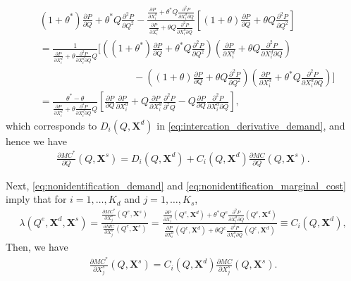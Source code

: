 \documentclass[11pt, a4paper]{article}
\begin{document}
\begin{align}
    &(1+ \theta^{*})\frac{\partial P}{\partial Q} + \theta^{*} Q\frac{\partial^2 P}{\partial Q^2} - \frac{\frac{\partial P}{\partial X^{d}_i} + \theta^{*} Q\frac{\partial^2 P}{\partial X^{d}_i\partial Q} }{\frac{\partial P}{\partial X^{d}_i} + \theta Q\frac{\partial^2 P}{\partial X^{d}_i\partial Q} }\left[(1+ \theta) \frac{\partial P}{\partial Q} + \theta Q\frac{\partial^2 P}{\partial Q^2}\right]\\
    &= \frac{1}{\frac{\partial P}{\partial X^{d}_i} + \theta\frac{\partial^2 P}{\partial X^{d}_i\partial Q}Q}\Bigg[\left((1 + \theta^{*}) \frac{\partial P}{\partial Q} + \theta^{*} Q\frac{\partial^2 P}{\partial  Q^2}\right)\left(\frac{\partial P}{\partial X^{d}_i} + \theta Q\frac{\partial^2 P}{\partial X^{d}_i\partial Q}\right)\\
    &\hspace{4cm} - \left( (1 + \theta) \frac{\partial P}{\partial Q} + \theta Q\frac{\partial^2 P}{\partial Q^2}\right)\left(\frac{\partial P}{\partial X^{d}_i} + \theta^{*} Q\frac{\partial^2 P}{\partial X^{d}_i\partial Q}\right)\Bigg]\\
    & =  \frac{\theta^{*} - \theta}{\frac{\partial P}{\partial X^{d}_i} + \theta\frac{\partial^2 P}{\partial X^{d}_i\partial Q}Q}\left[ \frac{\partial P}{\partial Q} \frac{\partial P}{\partial X^{d}_i} + Q\frac{\partial P}{\partial X^{d}_i}\frac{\partial^2 P}{\partial^2 Q} - Q\frac{\partial P}{\partial Q}\frac{\partial^2 P}{\partial X^{d}_i \partial Q} \right],
\end{align}
which corresponds to $D_i(Q, \bm{X}^{d})$ in \eqref{eq:intercation_derivative_demand}, and hence we have
\begin{align}
    \frac{\partial MC^{*}}{\partial Q}(Q, \bm{X}^{s}) = D_i(Q, \bm{X}^{d}) + C_i(Q, \bm{X}^{d})\frac{\partial MC}{\partial Q}(Q, \bm{X}^{s}).
\end{align}

Next, \eqref{eq:nonidentification_demand} and \eqref{eq:nonidentification_marginal_cost} imply that for $i = 1, \ldots, K_d$ and $j = 1, \ldots, K_s$,
\begin{align}
    \lambda(Q^e, \bm{X}^{d}, \bm{X}^{s}) =  \frac{\frac{\partial MC^{*}}{\partial X^{s}_j}(Q^e, \bm{X}^{s})}{\frac{\partial MC}{\partial X^{s}_j}(Q^e, \bm{X}^{s})} =  \frac{\frac{\partial P}{\partial X^{d}_i}(Q^e, \bm{X}^{d}) + \theta^{*} Q^e\frac{\partial^2 P}{\partial X^{d}_i\partial Q}(Q^e, \bm{X}^{d}) }{\frac{\partial P}{\partial X^{d}_i}(Q^e, \bm{X}^{d}) + \theta Q^e\frac{\partial^2 P}{\partial X^{d}_i\partial Q}(Q^e, \bm{X}^{d})} \equiv C_i(Q, \bm{X}^{d}),
\end{align}
Then, we have 
\begin{align}
    \frac{\partial MC^{*}}{\partial X^{s}_j}(Q, \bm{X}^{s}) = C_i(Q, \bm{X}^{d}) \frac{\partial MC}{\partial X^{s}_j}(Q, \bm{X}^{s}).
\end{align}
\end{document}
